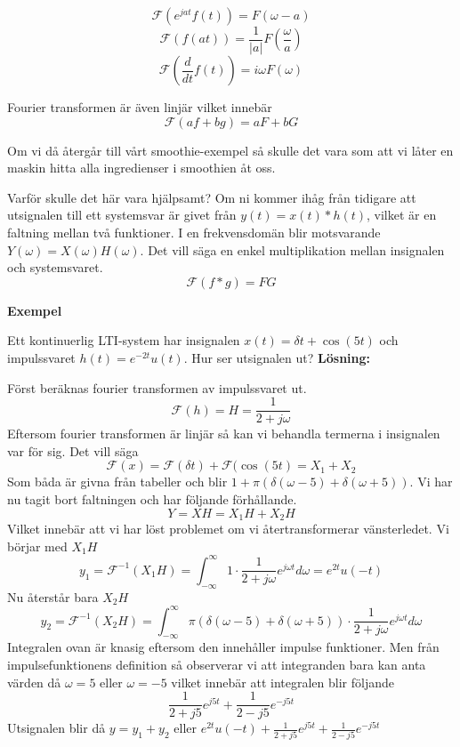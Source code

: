 \documentclass{article}
\begin{document}
$$\mathcal{F}(e^{j a t} f(t)) = F(\omega - a)$$%
$$\mathcal{F}(f(at)) = \frac{1}{|a|}F(\frac{\omega}{a})$$%
$$\mathcal{F}(\frac{d}{dt} f(t)) = i\omega F(\omega) $$%

Fourier transformen är även linjär vilket innebär
$$\mathcal{F}(a f + b g) = a F + b G$$

Om vi då återgår till vårt smoothie-exempel så skulle det vara som att vi låter en maskin hitta alla ingredienser i smoothien åt oss.

Varför skulle det här vara hjälpsamt? Om ni kommer ihåg från tidigare att utsignalen till ett systemsvar är givet från $y(t) = x(t) * h(t)$, vilket är en faltning mellan två funktioner. I en frekvensdomän blir motsvarande $Y(\omega) = X(\omega) H(\omega)$. Det vill säga en enkel multiplikation mellan insignalen och systemsvaret. 
$$\mathcal{F}(f*g) = F G $$

\textbf{Exempel} %

Ett kontinuerlig LTI-system har insignalen $x(t)=\delta{t} + \cos(5 t)$ och impulssvaret $h(t) = e^{-2 t} u(t)$. Hur ser utsignalen ut?
\textbf{Lösning:}

Först beräknas fourier transformen av impulssvaret ut. 
$$\mathcal{F}(h) = H = \frac{1}{2+j \omega}$$
Eftersom fourier transformen är linjär så kan vi behandla termerna i insignalen var för sig. Det vill säga 
$$\mathcal{F} (x) = \mathcal{F}(\delta{t}) + \mathcal{F}(\cos(5 t) = X_1 + X_2 $$
Som båda är givna från tabeller och blir $1+\pi(\delta(\omega - 5) + \delta(\omega + 5))$. Vi har nu tagit bort faltningen och har följande förhållande.
$$Y = X H = X_1 H + X_2 H$$
Vilket innebär att vi har löst problemet om vi återtransformerar vänsterledet. Vi börjar med $X_1 H$
$$y_1=\mathcal{F}^{-1}(X_1 H) =  \int_{-\infty}^{\infty} 1 \cdot \frac{1}{2+j \omega} e^{j \omega t} d\omega = e^{2 t} u(-t)$$ 
Nu återstår bara $X_2 H$
$$y_2=\mathcal{F}^{-1}(X_2 H) = \int_{-\infty}^{\infty} \pi(\delta(\omega - 5) + \delta(\omega + 5)) \cdot \frac{1}{2+j \omega} e^{j \omega t} d\omega $$
Integralen ovan är knasig eftersom den innehåller impulse funktioner. Men från impulsefunktionens definition så observerar vi att integranden bara kan anta värden då $\omega=5$ eller $\omega =-5$ vilket innebär att integralen blir följande
$$\frac{1}{2+j 5} e^{j 5 t} + \frac{1}{2-j 5} e^{-j 5 t}$$ %
Utsignalen blir då $y=y_1 + y_2$ eller $e^{2 t} u(-t) + \frac{1}{2+j 5} e^{j 5 t} + \frac{1}{2-j 5} e^{-j 5 t}$
\end{document}
